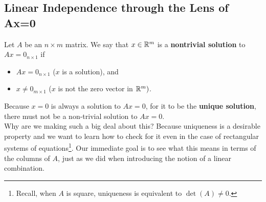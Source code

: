 \subsection{Linear Independence through the Lens of Ax=0}

Let $A$ be an $n \times m$ matrix. We say that $x\in \mathbb R^m$ is a \textbf{nontrivial solution} to $Ax=0_{n \times 1}$ if
\begin{itemize}
    \item $Ax=0_{n \times 1}$ ($x$ is a solution), and 
    \item $x\neq0_{m \times 1} $ ($x$ is not the zero vector in $\mathbb R^m)$. 
\end{itemize}
Because $x=0$ is always a solution to $Ax=0$, for it to be the \textbf{unique solution}, there must not be a non-trivial solution to $Ax=0.$\\

Why are we making such a big deal about this? Because uniqueness is a desirable property and we want to learn how to check for it even in the case of rectangular systems of equations\footnote{Recall, when $A$ is square, uniqueness is equivalent to $\det(A)\neq 0$.}. Our immediate goal is to see what this means in terms of the columns of $A$, just as we did when introducing the notion of a linear combination. \\

